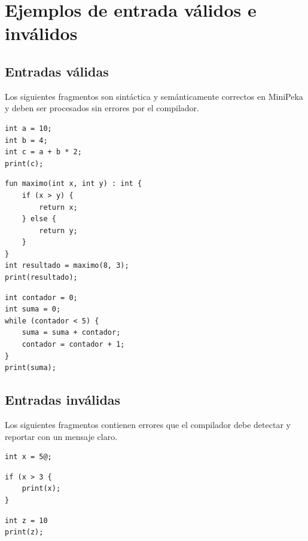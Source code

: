 \documentclass[12pt]{article}
\begin{document}
\section{Ejemplos de entrada válidos e inválidos}

\subsection{Entradas válidas}

Los siguientes fragmentos son sintáctica y semánticamente correctos en
MiniPeka y deben ser procesados sin errores por el compilador.

\begin{lstlisting}[caption={Ejemplo válido 1: operaciones aritméticas básicas}]
int a = 10;
int b = 4;
int c = a + b * 2;
print(c);
\end{lstlisting}

\begin{lstlisting}[caption={Ejemplo válido 2: función con retorno y condicional}]
fun maximo(int x, int y) : int {
    if (x > y) {
        return x;
    } else {
        return y;
    }
}
int resultado = maximo(8, 3);
print(resultado);
\end{lstlisting}

\begin{lstlisting}[caption={Ejemplo válido 3: ciclo while con acumulador}]
int contador = 0;
int suma = 0;
while (contador < 5) {
    suma = suma + contador;
    contador = contador + 1;
}
print(suma);
\end{lstlisting}

\subsection{Entradas inválidas}

Los siguientes fragmentos contienen errores que el compilador debe
detectar y reportar con un mensaje claro.

\begin{lstlisting}[caption={Error léxico: carácter inválido}]
int x = 5@;
\end{lstlisting}

\begin{lstlisting}[caption={Error sintáctico: paréntesis no balanceado}]
if (x > 3 {
    print(x);
}
\end{lstlisting}

\begin{lstlisting}[caption={Error sintáctico: instrucción sin punto y coma}]
int z = 10
print(z);
\end{lstlisting}
\end{document}

